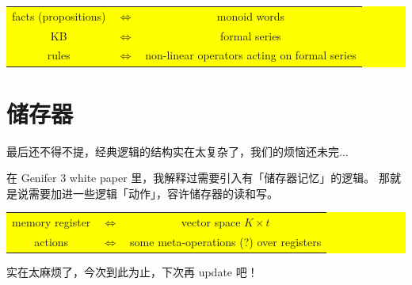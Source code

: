 \documentclass[12pt]{article}
\begin{document}
\begin{center}
\colorbox{yellow}{\parbox{0.9\textwidth}{
\begin{tabular}{ccc}
facts (propositions) & $\Leftrightarrow$ & monoid words \\
KB & $\Leftrightarrow$ & formal series \\
rules & $\Leftrightarrow$ & non-linear operators acting on formal series \\
\end{tabular}
}}
\end{center}

\section{储存器}

最后还不得不提，经典逻辑的结构实在太复杂了，我们的烦恼还未完...

在 Genifer 3 white paper 里，我解释过需要引入有「储存器记忆」的逻辑。  那就是说需要加进一些逻辑「动作」，容许储存器的读和写。

\begin{center}
\colorbox{yellow}{\parbox{0.85\textwidth}{
\begin{tabular}{ccc}
memory register & $\Leftrightarrow$ & vector space $K \times t$ \\ 
actions & $\Leftrightarrow$ & some meta-operations (?) over registers\\
\end{tabular}
}}
\end{center}

实在太麻烦了，今次到此为止，下次再 update 吧！
\end{document}
